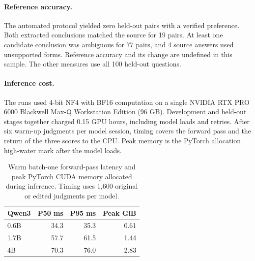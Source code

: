 \paragraph{Reference accuracy.}

The automated protocol yielded zero held-out pairs with a verified preference. Both extracted conclusions matched the source for 19 pairs. At least one candidate conclusion was ambiguous for 77 pairs, and 4 source answers used unsupported forms. Reference accuracy and its change are undefined in this sample. The other measures use all 100 held-out questions.





\paragraph{Inference cost.}

The runs used 4-bit NF4 with BF16 computation on a single NVIDIA RTX PRO 6000 Blackwell Max-Q Workstation Edition (96 GB). Development and held-out stages together charged 0.15 GPU hours, including model loads and retries. After six warm-up judgments per model session, timing covers the forward pass and the return of the three scores to the CPU. Peak memory is the PyTorch allocation high-water mark after the model loads.

\begin{table}[t]
\centering
\small
\setlength{\tabcolsep}{4.5pt}
\begin{tabular}{@{}lrrr@{}}
\toprule
Qwen3 & P50 ms & P95 ms & Peak GiB \\
\midrule
0.6B & 34.3 & 35.3 & 0.61 \\
1.7B & 57.7 & 61.5 & 1.44 \\
4B & 70.3 & 76.0 & 2.83 \\
\bottomrule
\end{tabular}
\caption{Warm batch-one forward-pass latency and peak PyTorch CUDA memory allocated during inference. Timing uses 1,600 original or edited judgments per model.}
\label{tab:efficiency}
\end{table}
